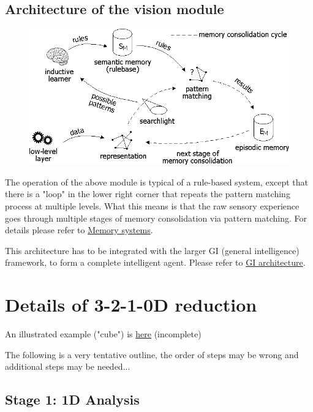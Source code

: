 \subsection{Architecture of the vision module}

\begin{figure}[H]
\centering
\includegraphics[scale=0.6]{VisionArchitecture.PNG}
\end{figure}

The operation of the above module is typical of a rule-based system, except that there is a "loop" in the lower right corner that repeats the pattern matching process at multiple levels. What this means is that the raw sensory experience goes through multiple stages of memory consolidation via pattern matching. For details please refer to \href{GI-MemorySystems.htm}{Memory systems}. 

This architecture has to be integrated with the larger GI (general intelligence) framework, to form a complete intelligent agent. Please refer to \href{GI-architecture.htm}{GI architecture}.

\section{Details of  3-2-1-0D reduction}

An illustrated example ("cube") is \href{Vis-Example.htm}{here} (incomplete)
 
\underconst

The following is a very tentative outline, the order of steps may be wrong and additional steps may be needed...

\subsection{Stage 1: 1D Analysis }

